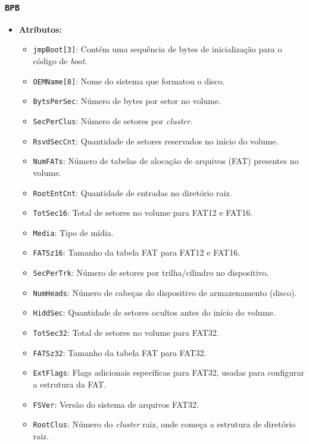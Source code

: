 \documentclass[
    12pt,				%
    oneside,   	        %
    a4paper,			%
    english,			%
    french,				%
    spanish,			%
    brazil,				%
    ]{pacotes/abntex2}
\begin{document}
\subsubsection{\texttt{BPB}}
\label{subsubsec:bpb}

\begin{itemize}
    \item \textbf{Atributos:}
        \begin{itemize}
            \item \texttt{jmpBoot[3]}: Contém uma sequência de bytes de inicialização para o código de \textit{boot}.
            \item \texttt{OEMName[8]}: Nome do sistema que formatou o disco.
            \item \texttt{BytsPerSec}: Número de bytes por setor no volume.
            \item \texttt{SecPerClus}: Número de setores por \textit{cluster}.
            \item \texttt{RsvdSecCnt}: Quantidade de setores reservados no início do volume.
            \item \texttt{NumFATs}: Número de tabelas de alocação de arquivos (FAT) presentes no volume.
            \item \texttt{RootEntCnt}: Quantidade de entradas no diretório raiz.
            \item \texttt{TotSec16}: Total de setores no volume para FAT12 e FAT16.
            \item \texttt{Media}: Tipo de mídia.
            \item \texttt{FATSz16}: Tamanho da tabela FAT para FAT12 e FAT16.
            \item \texttt{SecPerTrk}: Número de setores por trilha/cilindro no dispositivo.
            \item \texttt{NumHeads}: Número de cabeças do dispositivo de armazenamento (disco).
            \item \texttt{HiddSec}: Quantidade de setores ocultos antes do início do volume.
            \item \texttt{TotSec32}: Total de setores no volume para FAT32.
            \item \texttt{FATSz32}: Tamanho da tabela FAT para FAT32.
            \item \texttt{ExtFlags}: Flags adicionais específicas para FAT32, usadas para configurar a estrutura da FAT.
            \item \texttt{FSVer}: Versão do sistema de arquivos FAT32.
            \item \texttt{RootClus}: Número do \textit{cluster} raiz, onde começa a estrutura de diretório raiz.

\end{itemize}
\end{itemize}
\end{document}
